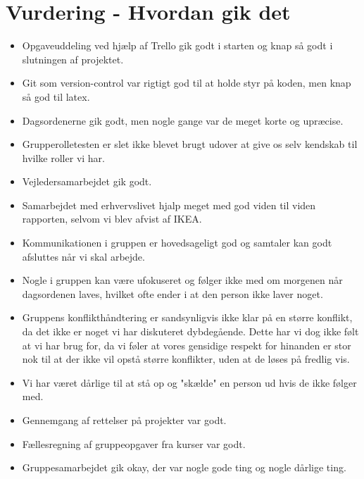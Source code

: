 \documentclass[oneside,a4paper,titlepage]{article}
\begin{document}


\section{Vurdering - Hvordan gik det}
\begin{itemize}
  \item Opgaveuddeling ved hjælp af Trello gik godt i starten og knap så godt i slutningen af projektet.
  \item Git som version-control var rigtigt god til at holde styr på koden, men knap så god til latex.
  \item Dagsordenerne gik godt, men nogle gange var de meget korte og upræcise.
  \item Grupperolletesten er slet ikke blevet brugt udover at give os selv kendskab til hvilke roller vi har.
  \item Vejledersamarbejdet gik godt.
  \item Samarbejdet med erhvervslivet hjalp meget med god viden til viden rapporten, selvom vi blev afvist af IKEA.
  \item Kommunikationen i gruppen er hovedsageligt god og samtaler kan godt afsluttes når vi skal arbejde. 
  \item Nogle i gruppen kan være ufokuseret og følger ikke med om morgenen når dagsordenen laves, hvilket ofte ender i at den person ikke laver noget.
  \item Gruppens konflikthåndtering er sandsynligvis ikke klar på en større konflikt, da det ikke er noget vi har diskuteret dybdegående. Dette har vi dog ikke følt at vi har brug for, da vi føler at vores gensidige respekt for hinanden er stor nok til at der ikke vil opstå større konflikter, uden at de løses på fredlig vis.
  \item Vi har været dårlige til at stå op og "skælde" en person ud hvis de ikke følger med.
  \item Gennemgang af rettelser på projekter var godt.
  \item Fællesregning af gruppeopgaver fra kurser var godt.
  \item Gruppesamarbejdet gik okay, der var nogle gode ting og nogle dårlige ting. 
\end{itemize}
\end{document}
